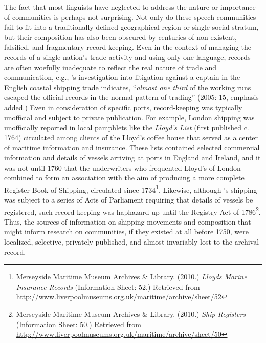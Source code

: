 The fact that most linguists have neglected to address the nature or importance of  communities is perhaps not surprising. Not only do these speech communities fail to fit into a traditionally defined geographical region or single social stratum, but their composition has also been obscured by centuries of non-existent, falsified, and fragmentary record-keeping. Even in the context of managing the records of a single nation’s trade activity and using only one language, records are often woefully inadequate to reflect the real nature of trade and communication, e.g., \citeauthor{Cook2005}’s investigation into  litigation against a captain in the English coastal shipping trade indicates, “\textit{almost one third} of the working runs escaped the official records in the normal pattern of trading” (2005: 15, emphasis added.) Even in consideration of specific ports, record-keeping was typically unofficial and subject to private publication. For example, London shipping was unofficially reported in local pamphlets like the \textit{Lloyd's List} (first published c. 1764) circulated among clients of the Lloyd’s coffee house that served as a center of maritime information and insurance. These lists contained selected commercial information and details of vessels arriving at ports in England and Ireland, and it was not until 1760 that the underwriters who frequented Lloyd’s of London combined to form an association with the aim of producing a more complete Register Book of Shipping, circulated since 1734\footnote{Merseyside Maritime Museum Archives \& Library. (2010.)  \textit{Lloyds Marine Insurance Records} (Information Sheet: 52.) Retrieved from \url{http://www.liverpoolmuseums.org.uk/maritime/archive/sheet/52}}. Likewise, although ’s shipping was subject to a series of Acts of Parliament requiring that details of vessels be registered, such record-keeping was haphazard up until the Registry Act of 1786\footnote{Merseyside Maritime Museum Archives \& Library. (2010.)  \textit{ Ship Registers} (Information Sheet: 50.) Retrieved from \url{http://www.liverpoolmuseums.org.uk/maritime/archive/sheet/50}}. Thus, the sources of information on shipping movements and  composition that might inform research on  communities, if they existed at all before 1750, were localized, selective, privately published, and almost invariably lost to the archival record. 

